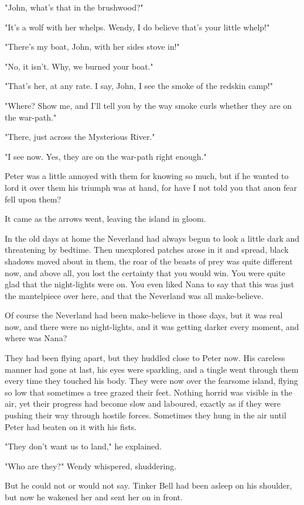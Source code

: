 "John, what's that in the brushwood?"

"It's a wolf with her whelps.
Wendy, I do believe that's your little whelp!"

"There's my boat, John, with her sides stove in!"

"No, it isn't.
Why, we burned your boat."

"That's her, at any rate.
I say, John, I see the smoke of the redskin camp!"

"Where?
Show me, and I'll tell you by the way smoke curls whether they are on the war-path."

"There, just across the Mysterious River."

"I see now.
Yes, they are on the war-path right enough."

Peter was a little annoyed with them for knowing so much,
but if he wanted to lord it over them his triumph was at hand,
for have I not told you that anon fear fell upon them?

It came as the arrows went, leaving the island in gloom.

In the old days at home the Neverland had always begun to look a little dark and threatening by bedtime.
Then unexplored patches arose in it and spread, black shadows moved about in them,
the roar of the beasts of prey was quite different now,
and above all, you lost the certainty that you would win.
You were quite glad that the night-lights were on.
You even liked Nana to say that this was just the mantelpiece over here,
and that the Neverland was all make-believe.

Of course the Neverland had been make-believe in those days,
but it was real now, and there were no night-lights,
and it was getting darker every moment, and where was Nana?

They had been flying apart, but they huddled close to Peter now.
His careless manner had gone at last,
his eyes were sparkling, and a tingle went through them every time they touched his body.
They were now over the fearsome island, flying so low that sometimes a tree grazed their feet.
Nothing horrid was visible in the air,
yet their progress had become slow and laboured,
exactly as if they were pushing their way through hostile forces.
Sometimes they hung in the air until Peter had beaten on it with his fists.

"They don't want us to land," he explained.

"Who are they?\@" Wendy whispered, shuddering.

But he could not or would not say.
Tinker Bell had been asleep on his shoulder,
but now he wakened her and sent her on in front.

